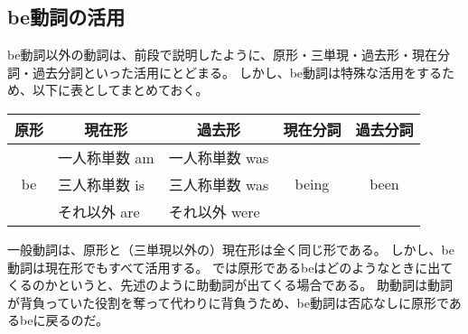 \subsection{be動詞の活用}

be動詞以外の動詞は、前段で説明したように、原形・三単現・過去形・現在分詞・過去分詞といった活用にとどまる。
しかし、be動詞は特殊な活用をするため、以下に表としてまとめておく。

\begin{table}[h]
  \centering
  \begin{tabular}{cllcc}
    \hline
    原形 & \multicolumn{1}{c}{現在形} & \multicolumn{1}{c}{過去形} & 現在分詞 & 過去分詞\\
    \hline \hline
     & 一人称単数 am & 一人称単数 was & & \\
    be & 三人称単数 is & 三人称単数 was & being & been \\
     & それ以外 are & それ以外 were & & \\
     \hline
  \end{tabular}
\end{table}

一般動詞は、原形と（三単現以外の）現在形は全く同じ形である。
しかし、be動詞は現在形でもすべて活用する。
では原形であるbeはどのようなときに出てくるのかというと、先述のように助動詞が出てくる場合である。
助動詞は動詞が背負っていた役割を奪って代わりに背負うため、be動詞は否応なしに原形であるbeに戻るのだ。
